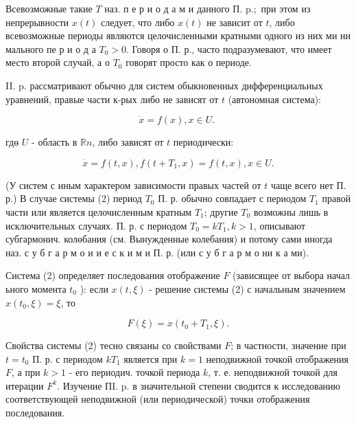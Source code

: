 \documentclass[10pt]{article}
\begin{document}
Всевозможные такие $T$ наз. п е р и о д а м и данного П. $\mathrm{p} . ;$ при этом из непрерывности $x(t)$ следует, что либо $x(t)$ не зависит от $t$, либо всевозможные периоды являются целочисленными кратными одного из них ми ни мального пе р и о д а $T_{0}>0$. Говоря о П. р., часто подразумевают, что имеет место второй случай, а о $T_{0}$ говорят просто как о периоде.



II. p. рассматривают обычно для систем обыкновенных дифференциальных уравнений, правые части к-рых либо не зависят от $t$ (автономная система):



\[

\dot{x}=f(x), x \in U \text {. }

\]



гдө $U$ - область в $\mathbb{R} n$, либо зависят от $t$ периодически:



\[

\dot{x}=f(t, x), f\left(t+T_{1}, x\right)=f(t, x), x \in U .

\]



(У систем с иным характером зависимости правых частей от $t$ чаще всего нет П. р.) В случае системы (2) период $T_{0}$ П. р. обычно совпадает с периодом $T_{1}$ правой части или является целочисленным кратным $T_{1}$; другие $T_{0}$ возможны лишь в исключительных случаях. П. р. с периодом $T_{0}=k T_{1}, k>1$, описывают субгармонич. колөбания (см. Вынужденные колебания) и потому сами иногда наз. с у б г а р м о и и е с к и м и П. р. (или с у б г а р м о ни к а ми).



Система (2) определяет последования отображение $F$ (зависящее от выбора начал ьного момента $t_{0}$ ): если $x(t, \xi)$ - решение системы (2) с начальным значением $x\left(t_{0}, \xi\right)=\xi$, то



\[

F(\xi)=x\left(t_{0}+T_{1}, \xi\right) .

\]



Свойства системы (2) тесно связаны со свойствами $F$; в частности, значение при $t=t_{0}$ П. р. с периодом $k T_{1}$ является при $k=1$ неподвижной точкой отображения $F$, а при $k>1$ - его периодич. точкой периода $k$, т. е. неподвижной точкой для итерации $F^{k}$. Изучение ПI. p. в значительной степени сводится к исследованию соответствующей неподвижной (или периодической) точки отображения последования.
\end{document}
